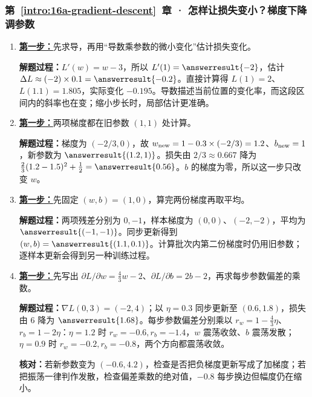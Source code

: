 \subsubsection*{第~\ref*{intro:16a-gradient-descent}~章 · 怎样让损失变小？梯度下降调参数}
\begin{enumerate}[label={},leftmargin=4.8em,itemsep=4pt]
\item[\textbf{C-007.}] \leavevmode{}\label{solution:C-007}\label{solution:local-derivative-change}\hyperref[exercise:local-derivative-change]{\textbf{第一步：}}先求导，再用“导数乘参数的微小变化”估计损失变化。\par\nobreak
\textbf{解题过程：}$L'(w)=w-3$，所以 $L'(1)=\answerresult{-2}$，估计 $\Delta L\approx(-2)\times0.1=\answerresult{-0.2}$。直接计算得 $L(1)=2$、$L(1.1)=1.805$，实际变化 $-0.195$。导数描述当前位置的变化率，而这段区间内的斜率也在变；缩小步长时，局部估计更准确。
\item[\textbf{C-008.}] \leavevmode{}\label{solution:C-008}\label{solution:synchronous-gradient-step}\hyperref[exercise:synchronous-gradient-step]{\textbf{第一步：}}两项梯度都在旧参数 $(1,1)$ 处计算。\par\nobreak
\textbf{解题过程：}梯度为 $(-2/3,0)$，故 $w_{\rm new}=1-0.3\times(-2/3)=1.2$、$b_{\rm new}=1$，新参数为 $\answerresult{(1.2,1)}$。损失由 $2/3\approx0.667$ 降为 $\tfrac23(1.2-1.5)^2+\tfrac12=\answerresult{0.56}$。$b$ 的梯度为零，所以这一步只改变 $w$。
\item[\textbf{C-009.}] \leavevmode{}\label{solution:C-009}\label{solution:mini-batch-gradient-average}\hyperref[exercise:mini-batch-gradient-average]{\textbf{第一步：}}先固定 $(w,b)=(1,0)$，算完两份梯度再取平均。\par\nobreak
\textbf{解题过程：}两项残差分别为 $0,-1$，样本梯度为 $(0,0)$、$(-2,-2)$，平均为 $\answerresult{(-1,-1)}$。同步更新得到 $(w,b)=\answerresult{(1.1,0.1)}$。计算批次内第二份梯度时仍用旧参数；逐样本更新会得到另一种训练过程。
\item[\textbf{C-010.}] \leavevmode{}\label{solution:C-010}\label{solution:quadratic-gradient-transfer}\hyperref[exercise:quadratic-gradient-transfer]{\textbf{第一步：}}先写出 $\partial L/\partial w=\tfrac43w-2$、$\partial L/\partial b=2b-2$，再求每步参数偏差的乘数。\par\nobreak
\textbf{解题过程：}$\nabla L(0,3)=(-2,4)$；以 $\eta=0.3$ 同步更新至 $(0.6,1.8)$，损失由 $6$ 降为 $\answerresult{1.68}$。每步参数偏差分别乘以 $r_w=1-\tfrac43\eta$、$r_b=1-2\eta$：$\eta=1.2$ 时 $r_w=-0.6,r_b=-1.4$，$w$ 震荡收敛、$b$ 震荡发散；$\eta=0.9$ 时 $r_w=-0.2,r_b=-0.8$，两个方向都震荡收敛。\par\textbf{核对：}若新参数变为 $(-0.6,4.2)$，检查是否把负梯度更新写成了加梯度；若把振荡一律判作发散，检查偏差乘数的绝对值，$-0.8$ 每步换边但幅度仍在缩小。

\end{enumerate}
